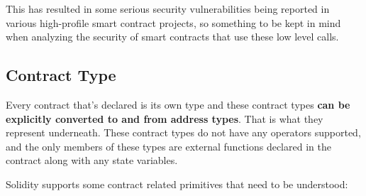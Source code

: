 This has resulted in some serious security vulnerabilities being
reported in various high-profile smart contract projects, so something
to be kept in mind when analyzing the security of smart contracts that
use these low level calls.

\subsection{Contract Type}\label{contract-type}

Every contract that's declared is its own type and these contract types
\textbf{can be explicitly converted to and from address types}. That is
what they represent underneath. These contract types do not have any
operators supported, and the only members of these types are external
functions declared in the contract along with any state variables.

Solidity supports some contract related primitives that need to be
understood:

